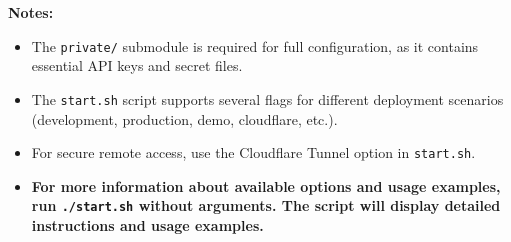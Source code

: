 \documentclass[a4paper,11pt]{report}
\begin{document}
\textbf{Notes:}
\begin{itemize}
    \item The \texttt{private/} submodule is required for full configuration, as it contains essential API keys and secret files.
    \item The \texttt{start.sh} script supports several flags for different deployment scenarios (development, production, demo, cloudflare, etc.).
    \item For secure remote access, use the Cloudflare Tunnel option in \texttt{start.sh}.
    \item \textbf{For more information about available options and usage examples, run \texttt{./start.sh} without arguments. The script will display detailed instructions and usage examples.}
\end{itemize}
\end{document}

